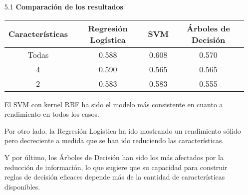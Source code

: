 \documentclass{article}
\begin{document}
\bigskip

\begin{itemize}

\item[5.1]  {\bf Comparaci\'on de los resultados}

\begin{table}[h]
  \begin{center}
    \begin{tabular}{| c | c | c | c | }
      \hline
      Caracter\'isticas & Regresi\'on Log\'istica & SVM & \'Arboles de Decisi\'on \\ \hline
      Todas & 0.588 & 0.608 & 0.570 \\
      4     & 0.590 & 0.565 & 0.565 \\
      2     & 0.583 & 0.583 & 0.555 \\ \hline
    \end{tabular}
  \end{center}
\end{table}

El SVM con kernel RBF ha sido el modelo m\'as consistente en cuanto a rendimiento en todos los casos. 

Por otro lado, la Regresi\'on Log\'istica ha ido mostrando un rendimiento s\'olido pero decreciente a medida que se han ido reduciendo las caracter\'isticas. 

Y por \'ultimo, los \'Arboles de Decisi\'on han sido los m\'as afectados por la reducci\'on de informaci\'on, lo que sugiere que su capacidad para construir reglas de decisi\'on eficaces depende m\'as de la cantidad de caracter\'isticas disponibles.

\end{itemize}

\bigskip
\end{document}
